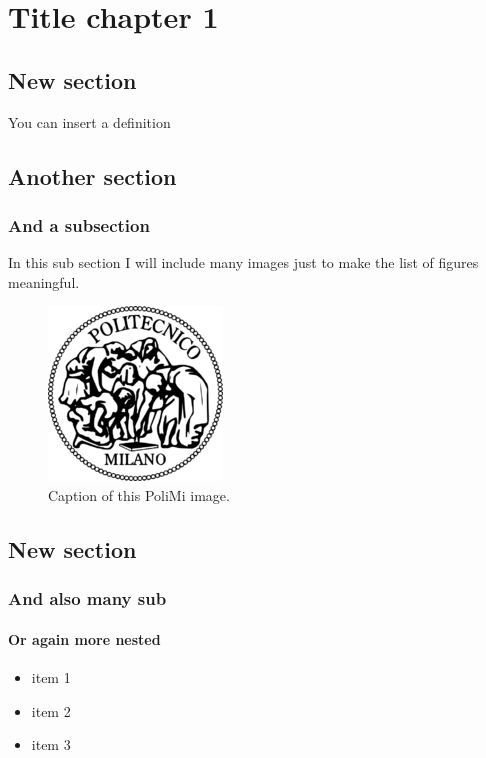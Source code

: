 \chapter{Title chapter 1}


\section{New section}
You can insert a definition
	
\section{Another section}
	\subsection{And a subsection}
		In this sub section I will include many images just to make the list of figures meaningful.

			\begin{figure}[h!tb]
				\centerline {\includegraphics[scale=0.6]{img/logopoli.png}}
				\caption{Caption of this PoliMi image.}
				\label{fig:leet}
			\end{figure}

\section{New section}
	\subsection{And also many sub}
		\subsubsection{Or again more nested}
			\begin{itemize}
				\item item 1
				\item item 2
				\item item 3
			\end{itemize}			
			
